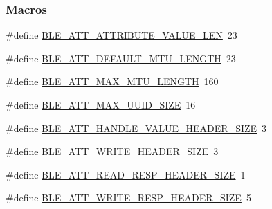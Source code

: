 \subsubsection*{Macros}
\begin{DoxyCompactItemize}
\item 
\#define \hyperlink{group___b_l_e___g_a_t_t_ga4d1bd224084bd70c854891e4876dcf6f}{B\+L\+E\+\_\+\+A\+T\+T\+\_\+\+A\+T\+T\+R\+I\+B\+U\+T\+E\+\_\+\+V\+A\+L\+U\+E\+\_\+\+L\+EN}~23
\item 
\#define \hyperlink{group___b_l_e___g_a_t_t_gad67dc15fa3333c9a35a28d20dec4d848}{B\+L\+E\+\_\+\+A\+T\+T\+\_\+\+D\+E\+F\+A\+U\+L\+T\+\_\+\+M\+T\+U\+\_\+\+L\+E\+N\+G\+TH}~23
\item 
\#define \hyperlink{group___b_l_e___g_a_t_t_ga380151ce5e77dadfae069f37afd70b8b}{B\+L\+E\+\_\+\+A\+T\+T\+\_\+\+M\+A\+X\+\_\+\+M\+T\+U\+\_\+\+L\+E\+N\+G\+TH}~160
\item 
\#define \hyperlink{group___b_l_e___g_a_t_t_gaf7a0af4a975d6ef5bcb00e86d9098390}{B\+L\+E\+\_\+\+A\+T\+T\+\_\+\+M\+A\+X\+\_\+\+U\+U\+I\+D\+\_\+\+S\+I\+ZE}~16
\item 
\#define \hyperlink{group___b_l_e___g_a_t_t_ga824bb76855b7f0e87c25d8050b1d94bd}{B\+L\+E\+\_\+\+A\+T\+T\+\_\+\+H\+A\+N\+D\+L\+E\+\_\+\+V\+A\+L\+U\+E\+\_\+\+H\+E\+A\+D\+E\+R\+\_\+\+S\+I\+ZE}~3
\item 
\#define \hyperlink{group___b_l_e___g_a_t_t_ga433fb9d859cdfa9d22acf4c6af69e1a3}{B\+L\+E\+\_\+\+A\+T\+T\+\_\+\+W\+R\+I\+T\+E\+\_\+\+H\+E\+A\+D\+E\+R\+\_\+\+S\+I\+ZE}~3
\item 
\#define \hyperlink{group___b_l_e___g_a_t_t_ga60b268cf9ce073bd7372e5c903f9aff8}{B\+L\+E\+\_\+\+A\+T\+T\+\_\+\+R\+E\+A\+D\+\_\+\+R\+E\+S\+P\+\_\+\+H\+E\+A\+D\+E\+R\+\_\+\+S\+I\+ZE}~1
\item 
\#define \hyperlink{group___b_l_e___g_a_t_t_ga6a4807bfe93a96506caa739c30038acd}{B\+L\+E\+\_\+\+A\+T\+T\+\_\+\+W\+R\+I\+T\+E\+\_\+\+R\+E\+S\+P\+\_\+\+H\+E\+A\+D\+E\+R\+\_\+\+S\+I\+ZE}~5
\end{DoxyCompactItemize}
